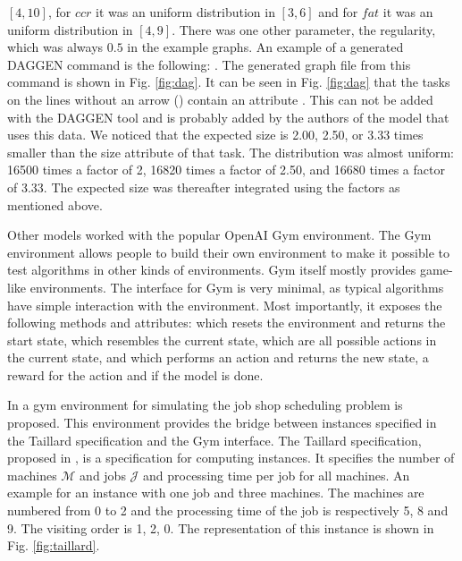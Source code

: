 $[4, 10]$, for $ccr$ it was an uniform distribution in $[3, 6]$ and for $fat$
it was an uniform distribution in $[4, 9]$. There was one other parameter, the
regularity, which was always $0.5$ in the example graphs. An example of a
generated DAGGEN command is the following: . The generated graph file from this
command is shown in Fig. \ref{fig:dag}. It can be seen in Fig. \ref{fig:dag}
that the tasks on the lines without an arrow (\code{->}) contain an attribute
. This can not be added with the DAGGEN tool and is
probably added by the authors of the model that uses this data. We noticed
that the expected size is 2.00, 2.50, or 3.33 times smaller than the size
attribute of that task. The distribution was almost uniform: 16500 times a
factor of 2, 16820 times a factor of 2.50, and 16680 times a factor of 3.33.
The expected size was thereafter integrated using the factors as mentioned
above.




Other models worked with the popular OpenAI Gym environment. The Gym
environment allows people to build their own environment to make it possible
to test \rl algorithms in other kinds of environments. Gym itself mostly
provides game-like environments. The interface for Gym is very minimal, as
typical \rl algorithms have simple interaction with the environment. Most
importantly, it exposes the following methods and attributes:
 which resets the environment and returns the start state,
 which resembles the current state,
 which are all possible actions in the current state,
and  which performs an action and returns the new
state, a reward for the action and if the model is done.

In  a gym environment for simulating the job shop scheduling
problem is proposed. This environment provides the bridge between instances
specified in the Taillard specification and the Gym interface. The Taillard
specification, proposed in , is a specification for
computing instances. It specifies the number of machines $\mathcal{M}$ and
jobs $\mathcal{J}$ and processing time per job for all machines. An example
for an instance with one job and three machines. The machines are numbered
from 0 to 2 and the processing time of the job is respectively 5, 8 and 9. The
visiting order is 1, 2, 0. The representation of this instance is shown in
Fig. \ref{fig:taillard}.

